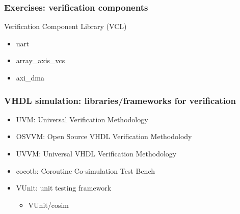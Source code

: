 \documentclass[xcolor={usenames,dvipsnames,svgnames}]{beamer}
\begin{document}
\begin{frame}
\frametitle{Exercises: verification components}
\begin{center}
Verification Component Library (VCL) \href{http://vunit.github.io/verification_components/user_guide.html}{\faBook}
\end{center}
\vfill
\begin{itemize}
  \item uart
  \href{https://github.com/VUnit/vunit/tree/master/examples/vhdl/uart}{\faCode}

  \vfill

  \item array\_axis\_vcs
  \href{https://github.com/VUnit/vunit/tree/master/examples/vhdl/array_axis_vcs}{\faCode}

  \vfill

  \item axi\_dma
  \href{https://github.com/VUnit/vunit/tree/master/examples/vhdl/axi_dma}{\faCode}
\end{itemize}
\vfill
\end{frame}

\begin{frame}
\frametitle{VHDL simulation: libraries/frameworks for verification}
\begin{itemize}
\item UVM: Universal Verification Methodology \href{https://en.wikipedia.org/wiki/Universal_Verification_Methodology}{\faWikipediaW}

\item OSVVM: Open Source VHDL Verification Methodolody
\href{https://osvvm.org/}{\faGlobe}
\href{https://github.com/OSVVM/OSVVM}{\faGithub}

\item UVVM: Universal VHDL Verification Methodology \href{https://bitvis.no/dev-tools/uvvm/}{\faGlobe}
\href{https://github.com/UVVM}{\faGithub}

\vfill

\item cocotb: Coroutine Co-simulation Test Bench
\href{https://github.com/cocotb/cocotb}{\faGithub}
\href{https://cocotb.rtfd.io}{\faBook}
\href{http://potential.ventures/cocotb}{\faGlobe}
\href{https://pypi.org/project/cocotb/}{\faCode}

\item VUnit: unit testing framework
\href{https://github.com/VUnit/vunit}{\faGithub}
\href{http://vunit.github.io/}{\faBook}
\href{https://pypi.org/project/vunit-hdl/}{\faCode}

\begin{itemize}
\item VUnit/cosim
\href{https://github.com/VUnit/cosim}{\faGithub}
\href{https://vunit.github.io/cosim/}{\faBook}
\end{itemize}
\end{itemize}
\end{frame}
\end{document}
